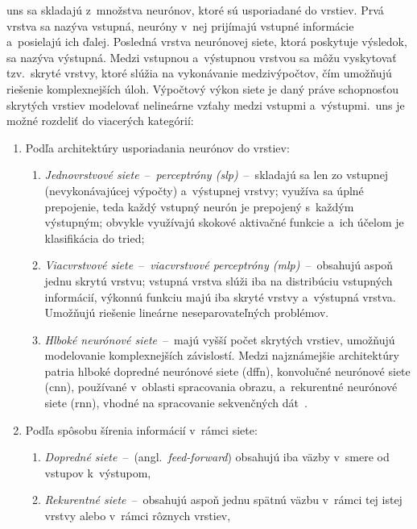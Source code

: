   \acrshort{uns} sa skladajú z~množstva neurónov, ktoré sú usporiadané do vrstiev. Prvá vrstva sa nazýva vstupná, neuróny v~nej prijímajú vstupné informácie a~posielajú ich ďalej. Posledná vrstva neurónovej siete, ktorá poskytuje výsledok, sa nazýva výstupná. Medzi vstupnou a~výstupnou vrstvou sa môžu vyskytovať tzv.\ skryté vrstvy, ktoré slúžia na vykonávanie medzivýpočtov, čím umožňujú riešenie komplexnejších úloh. Výpočtový výkon siete je daný práve schopnosťou skrytých vrstiev modelovať nelineárne vzťahy medzi vstupmi a~výstupmi.\ \acrshort{uns} je možné rozdeliť do viacerých kategórií:
  \begin{enumerate}
    \item Podľa architektúry usporiadania neurónov do vrstiev:
    \begin{enumerate}
      \item \emph{Jednovrstvové siete}~--~\emph{perceptróny (\acrshort{slp})}~--~skladajú sa len zo vstupnej (nevykonávajúcej výpočty) a~výstupnej vrstvy; využíva sa úplné prepojenie, teda každý vstupný neurón je prepojený s~každým výstupným; obvykle využívajú skokové aktivačné funkcie a~ich účelom je klasifikácia do tried;
      \item \emph{Viacvrstvové siete}~--~\emph{viacvrstvové perceptróny (\acrshort{mlp})}~--~obsahujú aspoň jednu skrytú vrstvu; vstupná vrstva slúži iba na distribúciu vstupných informácií, výkonnú funkciu majú iba skryté vrstvy a~výstupná vrstva. Umožňujú riešenie lineárne neseparovateľných problémov.
      \item \emph{Hlboké neurónové siete}~--~majú vyšší počet skrytých vrstiev, umožňujú modelovanie komplexnejších závislostí. Medzi najznámejšie architektúry patria hlboké dopredné neurónové siete (\acrshort{dffn}), konvolučné neurónové siete (\acrshort{cnn}), používané v~oblasti spracovania obrazu, a~rekurentné neurónové siete (\acrshort{rnn}), vhodné na spracovanie sekvenčných dát~\cite{lecunDeepLearning2015,schmidhuberDeepLearningNeural2015}.
    \end{enumerate}
    \item Podľa spôsobu šírenia informácií v~rámci siete:
    \begin{enumerate}
      \item \emph{Dopredné siete}~--~(angl.\ \emph{feed-forward}) obsahujú iba väzby v~smere od vstupov k~výstupom,
      \item \emph{Rekurentné siete}~--~obsahujú aspoň jednu spätnú väzbu v~rámci tej istej vrstvy alebo v~rámci rôznych vrstiev,
    \end{enumerate}
  \end{enumerate}
  
